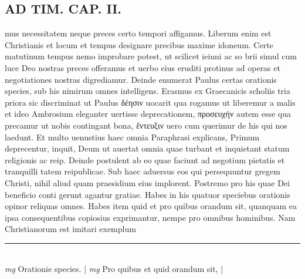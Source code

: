 \documentclass{article}
\begin{document}
\begin{pages}
\section*{AD TIM. CAP. II. }
\marginpar{[ p.112 ]}\pstart mus necessitatem neque preces certo tempori affigamus. Liberum enim est Christianis et locum et tempus designare precibus maxime idoneum. Certe matutinum tempus nemo improbare potest, ut scilicet ieiuni ac so brii simul cum luce Deo nostras preces offeramus et uerbo eius eruditi protinus ad operas et negotiationes nostras digrediamur. Deinde enumerat Paulus certas orationis species, sub his nimirum omnes intelligens. Erasmus ex Graecanicis scholiis tria priora sic discriminat ut Paulus δέησιν uocarit qua rogamus ut liberemur a malis et ideo Ambrosium eleganter uertisse deprecationem, προσευχήν autem esse qua precamur ut nobis contingant bona, ἔντευξιν uero cum querimur de his qui nos laedunt. Et multo uenustius haec omnia Paraphrasi explicans, Primum deprecentur, inquit, Deum ut auertat omnia quae turbant et inquietant statum religionis ac reip. Deinde postulent ab eo quae faciunt ad negotium pietatis et tranquilli tatem reipublicae. Sub haec aduersus eos qui persequuntur gregem Christi, nihil aliud quam praesidium eius implorent. Postremo pro his quae Dei beneficio conti gerunt agantur gratiae. Habes in his quatuor speciebus orationis opinor reliquas omnes. Habes item quid et pro quibus orandum sit, quanquam ea ipsa consequentibus copiosius exprimantur, nempe pro omnibus hominibus. Nam Christianorum est imitari exemplum  \pend
\vspace{0.5cm}\noindent
\vspace{0.2cm}\rule{1cm}{0.2pt}\\ 
\hspace{0.2cm}\textit{mg}
\footnotesize Orationie species. 
\normalsize| 
\hspace{0.2cm}\textit{mg}
\footnotesize Pro quibus et quid orandum sit, 
\normalsize| 

\end{pages}
\end{document}
